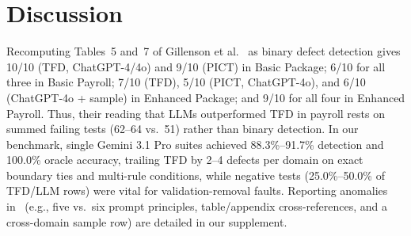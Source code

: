 \documentclass[acmsmall]{acmart}
\begin{document}
\section{Discussion}
\label{sec:discussion}

Recomputing Tables~5 and~7 of Gillenson et al.~\cite{Gillenson2026} as binary defect detection gives 10/10 (TFD, ChatGPT-4/4o) and 9/10 (PICT) in Basic Package; 6/10 for all three in Basic Payroll; 7/10 (TFD), 5/10 (PICT, ChatGPT-4o), and 6/10 (ChatGPT-4o + sample) in Enhanced Package; and 9/10 for all four in Enhanced Payroll. Thus, their reading that LLMs outperformed TFD in payroll rests on summed failing tests (62--64 vs.\ 51) rather than binary detection. In our benchmark, single Gemini 3.1 Pro suites achieved 88.3\%--91.7\% detection and 100.0\% oracle accuracy, trailing TFD by 2--4 defects per domain on exact boundary ties and multi-rule conditions, while negative tests (25.0\%--50.0\% of TFD/LLM rows) were vital for validation-removal faults. Reporting anomalies in~\cite{Gillenson2026} (e.g., five vs.\ six prompt principles, table/appendix cross-references, and a cross-domain sample row) are detailed in our supplement.
\end{document}
